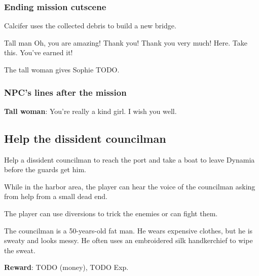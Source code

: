 \subsubsection*{Ending mission cutscene}
\begin{screenplay}

Calcifer uses the collected debris to build a new bridge.

\begin{dialogue}[excited]{Tall man}
Oh, you are amazing! Thank you! Thank you very much! Here. Take this. You've earned it!
\end{dialogue}

The tall woman gives Sophie TODO.

\end{screenplay}

\subsubsection*{NPC's lines after the mission}
\textbf{Tall woman}: You're really a kind girl. I wish you well.



\subsection{Help the dissident councilman}
Help a dissident councilman to reach the port and take a boat to leave Dynamia before the guards get him.

While in the harbor area, the player can hear the voice of the councilman asking from help from a small dead end.

The player can use diversions to trick the enemies or can fight them.

The councilman is a 50-years-old fat man. He wears expensive clothes, but he is sweaty and looks messy. He often uses an embroidered silk handkerchief to wipe the sweat.

\textbf{Reward}: TODO (money), TODO Exp.

